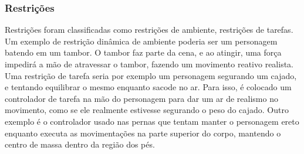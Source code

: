 \subsubsection{Restrições}

Restrições foram classificadas como restrições de ambiente, restrições de tarefas. Um exemplo de restrição dinâmica de ambiente poderia ser um personagem batendo em um tambor. O tambor faz parte da cena, e ao atingir, uma força impedirá a mão de atravessar o tambor, fazendo um movimento reativo realista. Uma restrição de tarefa seria por exemplo um personagem segurando um cajado, e tentando equilibrar o mesmo enquanto sacode no ar. Para isso, é colocado um controlador de tarefa na mão do personagem para dar um ar de realismo no movimento, como se ele realmente estivesse segurando o peso do cajado. Outro exemplo é o controlador usado nas pernas que tentam manter o personagem ereto enquanto executa as movimentações na parte superior do corpo, mantendo o centro de massa dentro da região dos pés.

